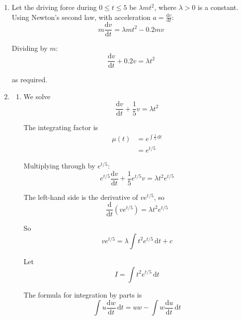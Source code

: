 \documentclass[leqno]{article}
\begin{document}
\begin{enumerate}[
  label=\textbf{\arabic*.},
  leftmargin=*,
  topsep=0pt,
  partopsep=0pt,
  parsep=0pt
]
\begin{djsSolution}
\begin{enumerate}[label=\textbf{(\alph*)}]
\begin{enumerate}[label=(\roman*)]
    Therefore
    \[
    v=5e^2e^{-t/5}-5=5\left(e^{2-t/5}-1\right)
    \]

    So the solution is $v=5\left(e^{2-t/5}-1\right)$ for $5 \le t \le 10$.

    \item Substituting $t=5$ into the result from part (i):
    \begin{align*}
    v(5)&=5\left(e^{2-1}-1\right) \\
    &=5(e-1)
    \end{align*}

    Hence the velocity when $t=5$ is $5(e-1)\,\mathrm{m\,s^{-1}}$.
  \end{enumerate}

  \item Let the driving force during $0 \le t \le 5$ be $\lambda mt^2$, where $\lambda>0$ is a constant. Using Newton's second law, with acceleration $a=\frac{\mathrm{d}v}{\mathrm{d}t}$:
  \[
  m\frac{\mathrm{d}v}{\mathrm{d}t}=\lambda mt^2-0.2mv
  \]

  Dividing by $m$:
  \[
  \frac{\mathrm{d}v}{\mathrm{d}t}+0.2v=\lambda t^2
  \]

  as required.

  \item \begin{enumerate}[label=(\roman*)]
    \item We solve
    \[
    \frac{\mathrm{d}v}{\mathrm{d}t}+\frac15v=\lambda t^2
    \]

    The integrating factor is
    \begin{align*}
    \mu(t)&=e^{\int \frac15\,\mathrm{d}t}\\
    &=e^{t/5}
    \end{align*}

    Multiplying through by $e^{t/5}$:
    \[
    e^{t/5}\frac{\mathrm{d}v}{\mathrm{d}t}+\frac15e^{t/5}v=\lambda t^2e^{t/5}
    \]

    The left-hand side is the derivative of $ve^{t/5}$, so
    \[
    \frac{\mathrm{d}}{\mathrm{d}t}\left(ve^{t/5}\right)=\lambda t^2e^{t/5}
    \]

    So
    \[
    ve^{t/5}=\lambda\int t^2e^{t/5}\,\mathrm{d}t+c
    \]

    Let
    \[
    I=\int t^2e^{t/5}\,\mathrm{d}t
    \]

    The formula for integration by parts is
    \[
    \int u\frac{\mathrm{d}w}{\mathrm{d}t}\,\mathrm{d}t=uw-\int w\frac{\mathrm{d}u}{\mathrm{d}t}\,\mathrm{d}t
    \]


\end{enumerate}
\end{enumerate}
\end{djsSolution}
\end{enumerate}
\end{document}
